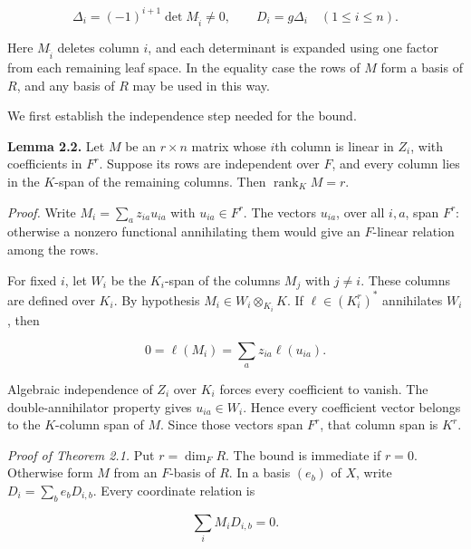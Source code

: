 \documentclass[11pt]{article}
\begin{document}
\nopagebreak[4]

\begin{equation}
\Delta_i=(-1)^{i+1}\det M_{\widehat i}\ne0,
\qquad D_i=g\Delta_i\quad(1\leq i\leq n).
\tag{6}
\end{equation}

Here $M_{\widehat i}$ deletes column $i$, and each determinant is expanded using one factor from each remaining leaf space. In the equality case the rows of $M$ form a basis of $R$, and any basis of $R$ may be used in this way.


We first establish the independence step needed for the bound.


\textbf{Lemma 2.2.} Let $M$ be an $r\times n$ matrix whose $i$th column is linear in $Z_i$, with coefficients in $F^r$. Suppose its rows are independent over $F$, and every column lies in the $K$-span of the remaining columns. Then $\operatorname{rank}_K M=r$.


\nopagebreak[4]

\emph{Proof.} Write $M_i=\sum_a z_{ia}u_{ia}$ with $u_{ia}\in F^r$. The vectors $u_{ia}$, over all $i,a$, span $F^r$: otherwise a nonzero functional annihilating them would give an $F$-linear relation among the rows.


For fixed $i$, let $W_i$ be the $K_i$-span of the columns $M_j$ with $j\ne i$. These columns are defined over $K_i$. By hypothesis $M_i\in W_i\otimes_{K_i}K$. If $\ell\in(K_i^r)^*$ annihilates $W_i$, then


\nopagebreak[4]

\begin{equation}
0=\ell(M_i)=\sum_a z_{ia}\ell(u_{ia}).
\tag{7}
\end{equation}

Algebraic independence of $Z_i$ over $K_i$ forces every coefficient to vanish. The double-annihilator property gives $u_{ia}\in W_i$. Hence every coefficient vector belongs to the $K$-column span of $M$. Since those vectors span $F^r$, that column span is $K^r$.


\emph{Proof of Theorem 2.1.} Put $r=\dim_F R$. The bound is immediate if $r=0$. Otherwise form $M$ from an $F$-basis of $R$. In a basis $(e_b)$ of $X$, write $D_i=\sum_b e_bD_{i,b}$. Every coordinate relation is


\nopagebreak[4]

\begin{equation}
\sum_i M_iD_{i,b}=0.
\tag{8}
\end{equation}
\end{document}
